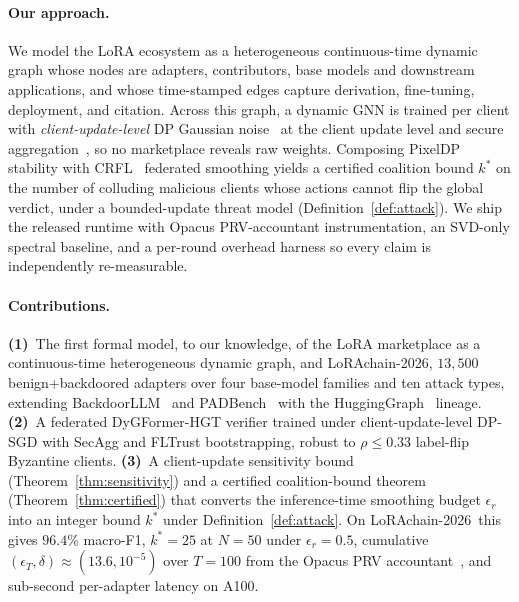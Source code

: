 \documentclass[11pt]{article}
\theoremstyle{plain}
\theoremstyle{definition}
\theoremstyle{remark}
\newcommand{\benchname}{LoRAchain-2026}
\begin{document}
\paragraph{Our approach.}
We model the LoRA ecosystem as a heterogeneous continuous-time
dynamic graph whose nodes are adapters, contributors, base models
and downstream applications, and whose time-stamped edges capture
derivation, fine-tuning, deployment, and citation. Across this
graph, a dynamic GNN is trained per client with
\emph{client-update-level} DP Gaussian
noise~\cite{abadi2016deep,mironov2017renyi} at the client update level and secure
aggregation~\cite{bonawitz2017practical}, so no marketplace
reveals raw weights. Composing PixelDP~\cite{lecuyer2019certified}
stability with CRFL~\cite{xie2021crfl} federated smoothing yields
a certified coalition bound $k^*$ on the number of colluding
malicious clients whose actions cannot flip the global verdict,
under a bounded-update threat model
(Definition~\ref{def:attack}). We ship the released runtime with
Opacus PRV-accountant instrumentation, an SVD-only spectral
baseline, and a per-round overhead harness so every claim is
independently re-measurable.

\paragraph{Contributions.}
\textbf{(1)}~The first formal model, to our knowledge, of the LoRA
marketplace as a continuous-time heterogeneous dynamic graph, and
\benchname, $13{,}500$ benign+backdoored adapters over four
base-model families and ten attack types, extending
BackdoorLLM~\cite{li2025backdoorllm} and
PADBench~\cite{sun2025peftguard} with
the HuggingGraph~\cite{rahman2025hugginggraph} lineage.
\textbf{(2)}~A federated DyGFormer-HGT verifier trained under
client-update-level DP-SGD with SecAgg and FLTrust bootstrapping,
robust to $\rho\le 0.33$ label-flip Byzantine clients.
\textbf{(3)}~A client-update sensitivity bound
(Theorem~\ref{thm:sensitivity}) and a certified coalition-bound
theorem (Theorem~\ref{thm:certified}) that converts the
inference-time smoothing budget $\epsilon_r$ into an integer
bound $k^*$ under Definition~\ref{def:attack}. On \benchname\
this gives $96.4\%$ macro-F1, $k^*=25$ at $N=50$ under
$\epsilon_r=0.5$, cumulative
$(\epsilon_T,\delta)\!\approx\!(13.6,10^{-5})$ over $T=100$ from
the Opacus PRV accountant~\cite{gopi2021numerical}, and
sub-second per-adapter latency on A100.
\end{document}
